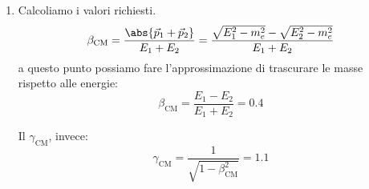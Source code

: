 \begin{example}[]
\begin{enumerate}
    \item Calcoliamo i valori richiesti.
      \begin{equation}
        \beta _\text{CM} = \frac{\abs{\vec{p}_{1} + \vec{p}_{2}}}{E_1 + E_2} =
        \frac{\sqrt{E_1^2 - m_e^2} - \sqrt{E_2^2 - m_e^2}}{E_1 + E_2}
      \end{equation}
      a questo punto possiamo fare l'approssimazione di trascurare le masse
      rispetto alle energie:
      \begin{equation}
        \beta _\text{CM} = \frac{E_1 - E_2}{E_1 + E_2} = 0.4
      \end{equation}

      Il $\gamma _\text{CM}$, invece:
      \begin{equation}
        \gamma _\text{CM} = \frac{1}{\sqrt{1 - \beta _\text{CM}^{2}}} = 1.1
      \end{equation}
  \end{enumerate}
\end{example}


